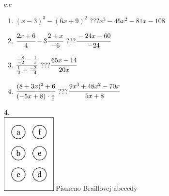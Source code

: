 \documentclass[10pt]{report}
\begin{document}
\begin{tabular}{c:c}
\begin{minipage}[c][104.5mm][t]{0.5\linewidth}
\begin{center}
\begin{minipage}{0.79\linewidth}
\begin{center}
\begin{varwidth}{\linewidth}
\begin{enumerate}
\item $(x-3)^3-(6x+9)^2$\quad \dotfill\; ???\;\dotfill \quad $x^3-45x^2-81x-108$
\item $\cfrac{2x+6}{4}-3\cfrac{2+x}{-6}$\quad \dotfill\; ???\;\dotfill \quad $\cfrac{-24x-60}{-24}$
\item $\cfrac{\frac{-8}{-2}-\frac{1}{x}}{\frac{1}{2}+\frac{-3}{-4}}$\quad \dotfill\; ???\;\dotfill \quad $\cfrac{65x-14}{20x}$
\item $\cfrac{(8+3x)^2+6}{(-5x+8)\cdot\frac{1}{x}}$\quad \dotfill\; ???\;\dotfill \quad $\cfrac{9x^3+48x^2-70x}{5x+8}$
\end{enumerate}
\end{varwidth}
\end{center}
\end{minipage}
\begin{minipage}{0.20\linewidth}
\begin{center}
{\Huge\bfseries 4.} \\[2mm]
\includegraphics[height=40mm]{../images/braille.png}
{\small Písmeno Braillovej abecedy}
\end{center}
\end{minipage}
\end{center}
\end{minipage}
%
\end{tabular}
\newpage
\thispagestyle{empty}
\end{document}
